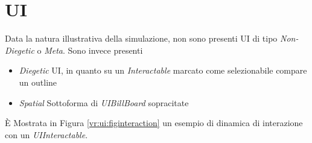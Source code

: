 \documentclass[10pt, openany]{article}
\begin{document}
  \section{UI}\label{vr:ui}
  \FloatBarrier
  Data la natura illustrativa della simulazione, non sono presenti UI di tipo \textit{Non-Diegetic} o \textit{Meta}. Sono invece presenti
  \begin{itemize}[topsep=0pt, noitemsep]
    \item \textit{Diegetic} UI, in quanto su un \textit{Interactable} marcato come selezionabile compare un outline
    \item \textit{Spatial} Sottoforma di \textit{UIBillBoard} sopracitate
  \end{itemize}
  \`E Mostrata in Figura \ref{vr:ui:figinteraction} un esempio di dinamica di interazione con un \textit{UIInteractable}.
\end{document}
